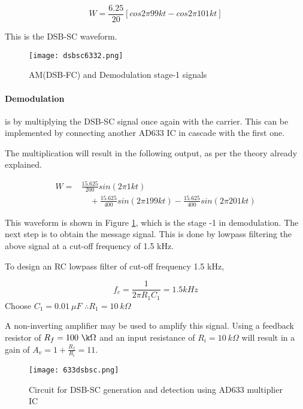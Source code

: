 \begin{equation}
W=\frac{6.25}{20}[cos 2\pi99kt-cos 2\pi101kt]
\end{equation}

 This is the DSB-SC waveform.
 
 \begin{figure}[ht]
\texttt{[image: dsbsc6332.png]}
\caption{AM(DSB-FC) and Demodulation stage-1 signals}
\label{dsbsc633plot2}
\end{figure}
 
 \paragraph{Demodulation}  is by multiplying the DSB-SC signal once again with the carrier. This can be implemented by connecting another AD633 IC in cascade with the first one.

\noindent The multiplication will result in the following output, as per the theory already explained.

\begin{equation}
\begin{split}
W=& \frac{15.625}{200}sin(2\pi 1kt)\\
&\quad  +\frac{15.625}{400}sin(2\pi199kt) -\frac{15.625}{400}sin(2\pi 201kt)
\end{split}
\end{equation}

\noindent This waveform is shown in Figure \ref{dsbsc633plot2}, which is the stage -1 in demodulation. The next step is to obtain the message signal. This is done by lowpass filtering the above signal at a cut-off frequency of 1.5 kHz.

To design an RC lowpass filter of cut-off frequency 1.5 kHz,

\begin{equation}
f_c=\frac{1}{2\pi R_1C_1}=1.5kHz
\end{equation}
Choose $C_1=0.01\  \mu F$
$\therefore  R_1 =10 \ k \Omega$

A non-inverting amplifier may be used to amplify this signal. Using a feedback resistor of $R_f= 100 \ \k \Omega$ and an input resistance of $R_i=10\ k\Omega$ will result in a gain of $A_v=1+\frac{R_f}{R_i}=11$.
\begin{sidewaysfigure}[ht]
    \texttt{[image: 633dsbsc.png]}
    \caption{Circuit for DSB-SC generation and detection using AD633 multiplier IC}
    \label{DSBSCckt}
\end{sidewaysfigure}


